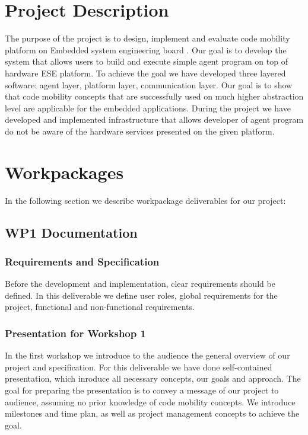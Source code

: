 \documentclass{scrreprt}
\begin{document}
	\section{Project Description}

The purpose of the project is to design, implement and evaluate code mobility platform on Embedded system engineering board \cite{galler}.
Our goal is to develop the system that allows users to build and execute simple agent program on top of  hardware ESE platform.
To achieve the goal we have developed three layered software: agent layer, platform layer, communication layer.
Our goal is to show that code mobility concepts that are successfully used on much higher abstraction level are applicable for the embedded applications.
During the project we have developed and implemented infrastructure that allows developer of agent program do not be aware of the hardware services presented on the given platform.


	\section{Workpackages}

In the following section we describe workpackage deliverables for our project:

	\subsection{WP1 Documentation}

	\subsubsection{Requirements and Specification}

Before the development and implementation, clear requirements should be defined.
In this deliverable we define user roles, global requirements for the project, functional and non-functional requirements.

	\subsubsection{Presentation for Workshop 1}

In the first workshop we introduce to the audience the general overview of our project and specification. 
For this deliverable we have done self-contained presentation, which inroduce all necessary concepts, our goals and approach.
The goal for preparing the presentation is to convey a message of our project
to audience, assuming no prior knowledge of code mobility concepts.
We introduce milestones and time plan, as well as project management concepts to achieve the goal.
\end{document}
